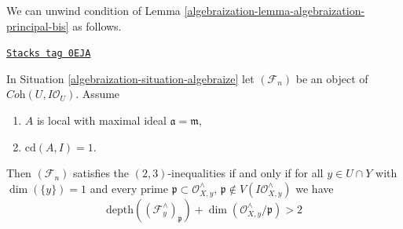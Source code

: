 We can unwind condition of
Lemma \ref{algebraization-lemma-algebraization-principal-bis} as follows.

\begin{lemma}
\label{algebraization-lemma-unwinding-conditions}
\href{https://stacks.math.columbia.edu/tag/0EJA}{\texttt{Stacks tag 0EJA}}

In Situation \ref{algebraization-situation-algebraize} let $(\mathcal{F}_n)$ be an object
of $\textit{Coh}(U, I\mathcal{O}_U)$. Assume
\begin{enumerate}
\item $A$ is local with maximal ideal $\mathfrak a = \mathfrak m$,
\item $\text{cd}(A, I) = 1$.
\end{enumerate}
Then $(\mathcal{F}_n)$ satisfies the $(2, 3)$-inequalities if and only
if for all $y \in U \cap Y$ with $\dim(\{y\}) = 1$ and every prime
$\mathfrak p \subset \mathcal{O}_{X, y}^\wedge$,
$\mathfrak p \not \in V(I\mathcal{O}_{X, y}^\wedge)$ we have
$$
\text{depth}((\mathcal{F}_y^\wedge)_\mathfrak p) +
\dim(\mathcal{O}_{X, y}^\wedge/\mathfrak p) > 2
$$
\end{lemma}

